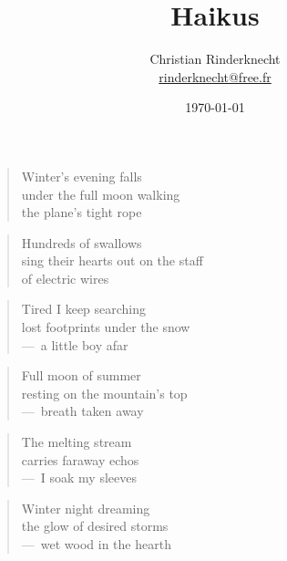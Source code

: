 \documentclass[a4paper,12pt]{article}
\title{Haikus}
\author{Christian Rinderknecht\\
{\small \url{rinderknecht@free.fr}}}
\date{\today}
\begin{document}
\begin{verse}
  Winter's evening falls \\
  under the full moon walking \\
  the plane's tight rope
\end{verse}

\begin{verse}
  Hundreds of swallows \\
  sing their hearts out on the staff \\
  of electric wires
\end{verse}

\begin{verse}
  Tired I keep searching \\
  lost footprints under the snow \\
  ---~a little boy afar
\end{verse}

\begin{verse}
  Full moon of summer \\
  resting on the mountain's top \\
  ---~breath taken away
\end{verse}

\begin{verse}
  The melting stream \\
  carries faraway echos \\
  ---~I soak my sleeves
\end{verse}

\begin{verse}
  Winter night dreaming \\
  the glow of desired storms \\
  ---~wet wood in the hearth
\end{verse}
\end{document}
